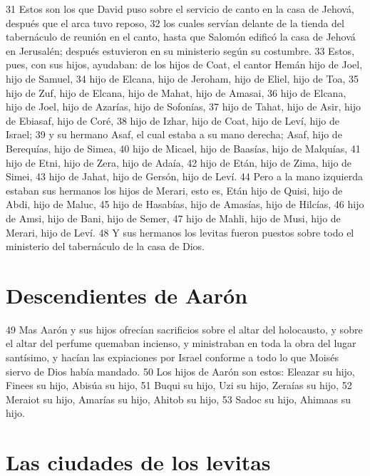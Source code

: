 31 Estos son los que David puso sobre el servicio de canto en la casa de Jehová, después que el arca tuvo reposo,
32 los cuales servían delante de la tienda del tabernáculo de reunión en el canto, hasta que Salomón edificó la casa de Jehová en Jerusalén; después estuvieron en su ministerio según su costumbre.
33 Estos, pues, con sus hijos, ayudaban: de los hijos de Coat, el cantor Hemán hijo de Joel, hijo de Samuel,
34 hijo de Elcana, hijo de Jeroham, hijo de Eliel, hijo de Toa, 
35 hijo de Zuf, hijo de Elcana, hijo de Mahat, hijo de Amasai,
36 hijo de Elcana, hijo de Joel, hijo de Azarías, hijo de Sofonías,
37 hijo de Tahat, hijo de Asir, hijo de Ebiasaf, hijo de Coré,
38 hijo de Izhar, hijo de Coat, hijo de Leví, hijo de Israel;
39 y su hermano Asaf, el cual estaba a su mano derecha; Asaf, hijo de Berequías, hijo de Simea,
40 hijo de Micael, hijo de Baasías, hijo de Malquías,
41 hijo de Etni, hijo de Zera, hijo de Adaía,
42 hijo de Etán, hijo de Zima, hijo de Simei,
43 hijo de Jahat, hijo de Gersón, hijo de Leví.
44 Pero a la mano izquierda estaban sus hermanos los hijos de Merari, esto es, Etán hijo de Quisi, hijo de Abdi, hijo de Maluc,
45 hijo de Hasabías, hijo de Amasías, hijo de Hilcías,
46 hijo de Amsi, hijo de Bani, hijo de Semer,
47 hijo de Mahli, hijo de Musi, hijo de Merari, hijo de Leví.
48 Y sus hermanos los levitas fueron puestos sobre todo el ministerio del tabernáculo de la casa de Dios.

\section*{Descendientes de Aarón}

49 Mas Aarón y sus hijos ofrecían sacrificios sobre el altar del holocausto, y sobre el altar del perfume quemaban incienso, y ministraban en toda la obra del lugar santísimo, y hacían las expiaciones por Israel conforme a todo lo que Moisés siervo de Dios había mandado.
50 Los hijos de Aarón son estos: Eleazar su hijo, Finees su hijo, Abisúa su hijo,
51 Buqui su hijo, Uzi su hijo, Zeraías su hijo,
52 Meraiot su hijo, Amarías su hijo, Ahitob su hijo,
53 Sadoc su hijo, Ahimaas su hijo.

\section*{Las ciudades de los levitas}

